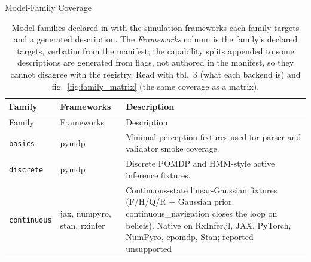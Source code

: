 \documentclass[
  ignorenonframetext,
]{beamer}
\begin{document}
\begin{frame}{Model-Family Coverage}
\begin{longtable}[]{@{}
  >{\raggedright\arraybackslash}p{}
  >{\raggedright\arraybackslash}p{}
  >{\raggedright\arraybackslash}p{}@{}}
\caption{Model families declared in
\protect{} with the simulation
frameworks each family targets and a generated description. The
\emph{Frameworks} column is the family's declared targets, verbatim from
the manifest; the capability splits appended to some descriptions are
generated from \protect{}
flags, not authored in the manifest, so they cannot disagree with the
registry. Read with tbl.~3 (what each backend
is) and fig.~\ref{fig:family_matrix} (the same coverage as a
matrix).}\label{tbl:model_families}\tabularnewline
\toprule\noalign{}
\begin{minipage}[b]{\linewidth}\raggedright
Family
\end{minipage} & \begin{minipage}[b]{\linewidth}\raggedright
Frameworks
\end{minipage} & \begin{minipage}[b]{\linewidth}\raggedright
Description
\end{minipage} \\
\midrule\noalign{}
\endfirsthead
\toprule\noalign{}
\begin{minipage}[b]{\linewidth}\raggedright
Family
\end{minipage} & \begin{minipage}[b]{\linewidth}\raggedright
Frameworks
\end{minipage} & \begin{minipage}[b]{\linewidth}\raggedright
Description
\end{minipage} \\
\midrule\noalign{}
\endhead
\texttt{basics} & pymdp & Minimal perception fixtures used for parser
and validator smoke coverage. \\
\texttt{discrete} & pymdp & Discrete POMDP and HMM-style active
inference fixtures. \\
\texttt{continuous} & jax, numpyro, stan, rxinfer & Continuous-state
linear-Gaussian fixtures (F/H/Q/R + Gaussian prior;
continuous\_navigation closes the loop on beliefs). Native on
RxInfer.jl, JAX, PyTorch, NumPyro, cpomdp, Stan; reported unsupported

\end{longtable}
\end{frame}
\end{document}
